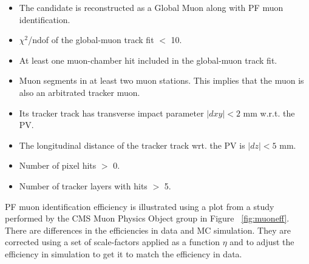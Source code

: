 \begin{itemize}
  \item The candidate is reconstructed as a Global Muon along with PF muon identification.
  \item $\chi^{2}$/ndof of the global-muon track fit $<$ 10.
  \item At least one muon-chamber hit included in the global-muon track fit.
  \item Muon segments in at least two muon stations. This implies that the muon is also an arbitrated tracker muon.
  \item Its tracker track has transverse impact parameter $|dxy| < 2$ mm w.r.t. the PV.
  \item The longitudinal distance of the tracker track wrt. the PV is $|dz| < 5$ mm.
  \item Number of pixel hits $>$ 0.
  \item Number of tracker layers with hits $>$ 5.
\end{itemize}

PF muon identification efficiency is illustrated using a plot from a study performed by the CMS Muon Physics Object group in Figure ~\ref{fig:muoneff}. There are differences in the efficiencies in data and MC simulation. They are corrected using a set of scale-factors applied as a function $\eta$ and \pt to adjust the efficiency in simulation to get it to match the efficiency in data.

